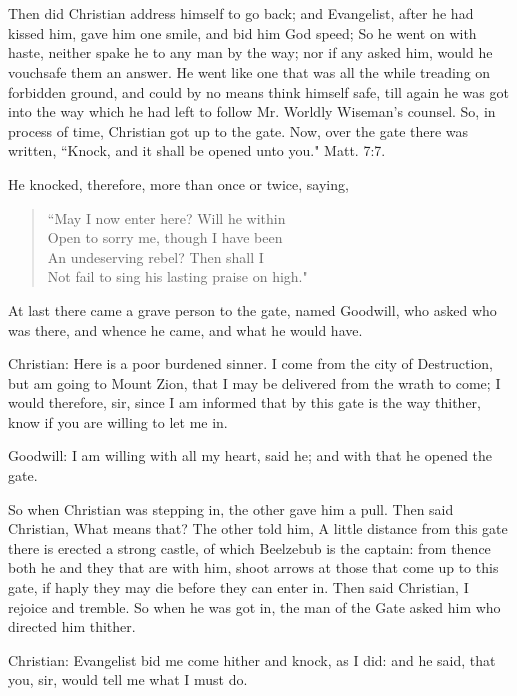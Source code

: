 \chapter[THE SECOND STAGE]{}

Then did Christian address himself to go back; and Evangelist, after he had kissed him, gave him one smile, and bid him God speed; So he went on with haste, neither spake he to any man by the way; nor if any asked him, would he vouchsafe them an answer. He went like one that was all the while treading on forbidden ground, and could by no means think himself safe, till again he was got into the way which he had left to follow Mr. Worldly Wiseman's counsel. So, in process of time, Christian got up to the gate. Now, over the gate there was written, ``Knock, and it shall be opened unto you." Matt. 7:7.

He knocked, therefore, more than once or twice, saying,
\begin{verse}
``May I now enter here? Will he within\\
Open to sorry me, though I have been\\
An undeserving rebel? Then shall I\\
Not fail to sing his lasting praise on high."\\
\end{verse}
At last there came a grave person to the gate, named Goodwill, who asked who was there, and whence he came, and what he would have.

Christian: Here is a poor burdened sinner. I come from the city of Destruction, but am going to Mount Zion, that I may be delivered from the wrath to come; I would therefore, sir, since I am informed that by this gate is the way thither, know if you are willing to let me in.

Goodwill: I am willing with all my heart, said he; and with that he opened the gate.

So when Christian was stepping in, the other gave him a pull. Then said Christian, What means that? The other told him, A little distance from this gate there is erected a strong castle, of which Beelzebub is the captain: from thence both he and they that are with him, shoot arrows at those that come up to this gate, if haply they may die before they can enter in. Then said Christian, I rejoice and tremble. So when he was got in, the man of the Gate asked him who directed him thither.

Christian: Evangelist bid me come hither and knock, as I did: and he said, that you, sir, would tell me what I must do.

